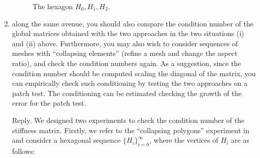 \documentclass[10pt]{amsart}
\theoremstyle{definition}
\theoremstyle{remark}
\begin{document}
\begin{enumerate}[1.]
\begin{figure}[h]
\centering
{}
\caption{The hexagon $H_0, H_1, H_2$.}
  \label{fig:collapsehexagon} %
\end{figure} 

\item \textsf{
along the same avenue, you should also compare the condition number of the
global matrices obtained with the two approaches in the two situations (i) and
(ii) above. Furthermore, you may also wish to consider sequences of meshes with
“collapsing elements” (refine a mesh and change the aspect ratio), and check the
condition numbers again.  As a suggestion, since the condition number should be
computed scaling the diagonal of the matrix, you can empirically check such
conditioning by testing the two approaches on a patch test. The conditioning can
be estimated checking the growth of the error for the patch test.
}

\smallskip \noindent \textcolor[rgb]{1.00,0.00,0.00}{Reply.}
We designed two experiments to check the condition number of the stiffness
matrix. Firstly, we refer to the ``collapsing polygons'' experiment in
\cite{Mascotto2018} and consider a hexagonal sequence
$\{H_i\}_{i=0}^{\infty}$, where the vertices of $H_i$ are as follows:


\end{enumerate}
\end{document}
